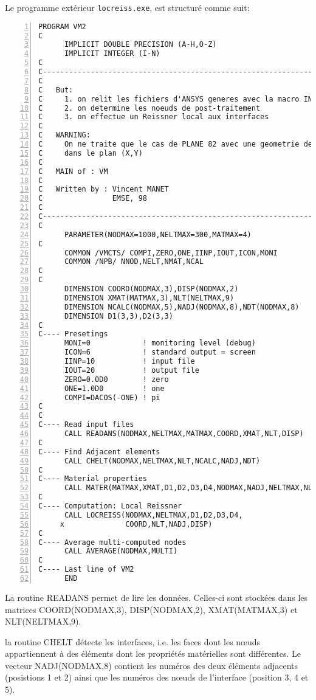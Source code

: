 Le programme extérieur \verb|locreiss.exe|, est structuré comme suit:

\color{gris}\scriptsize
\begin{Verbatim}[numbers=left,numbersep=3pt]
      PROGRAM VM2
C
      IMPLICIT DOUBLE PRECISION (A-H,O-Z)
      IMPLICIT INTEGER (I-N)
C
C--------------------------------------------------------------------------
C
C   But:
C     1. on relit les fichiers d'ANSYS generes avec la macro INTERF
C     2. on determine les noeuds de post-traitement
C     3. on effectue un Reissner local aux interfaces
C
C   WARNING:
C     On ne traite que le cas de PLANE 82 avec une geometrie definie
C     dans le plan (X,Y)
C
C   MAIN of : VM
C
C   Written by : Vincent MANET
C                EMSE, 98
C
C----------------------------------------------------------------------------
C
      PARAMETER(NODMAX=1000,NELTMAX=300,MATMAX=4)
C
      COMMON /VMCTS/ COMPI,ZERO,ONE,IINP,IOUT,ICON,MONI
      COMMON /NPB/ NNOD,NELT,NMAT,NCAL
C
C
      DIMENSION COORD(NODMAX,3),DISP(NODMAX,2)
      DIMENSION XMAT(MATMAX,3),NLT(NELTMAX,9)
      DIMENSION NCALC(NODMAX,5),NADJ(NODMAX,8),NDT(NODMAX,8)
      DIMENSION D1(3,3),D2(3,3)
C
C---- Presetings
      MONI=0            ! monitoring level (debug)
      ICON=6            ! standard output = screen
      IINP=10           ! input file
      IOUT=20           ! output file
      ZERO=0.0D0        ! zero
      ONE=1.0D0         ! one
      COMPI=DACOS(-ONE) ! pi
C
C
C---- Read input files
      CALL READANS(NODMAX,NELTMAX,MATMAX,COORD,XMAT,NLT,DISP)
C
C---- Find Adjacent elements
      CALL CHELT(NODMAX,NELTMAX,NLT,NCALC,NADJ,NDT)
C
C---- Material properties
      CALL MATER(MATMAX,XMAT,D1,D2,D3,D4,NODMAX,NADJ,NELTMAX,NLT)
C
C---- Computation: Local Reissner
      CALL LOCREISS(NODMAX,NELTMAX,D1,D2,D3,D4,
     x              COORD,NLT,NADJ,DISP)
C
C---- Average multi-computed nodes
      CALL AVERAGE(NODMAX,MULTI)
C
C---- Last line of VM2
      END
\end{Verbatim}
\color{black}\normalsize

\medskip
La routine READANS permet de lire les données. Celles-ci sont stockées dans les matrices
COORD(NODMAX,3), DISP(NODMAX,2), XMAT(MATMAX,3) et NLT(NELTMAX,9).

\medskip
la routine CHELT détecte les interfaces, i.e. les faces dont les nœuds appartiennent à des éléments dont les propriétés
matérielles sont différentes.
Le vecteur NADJ(NODMAX,8) contient les numéros des deux éléments adjacents (posistions 1 et 2) ainsi que les
numéros des nœuds de l'interface (position 3, 4 et 5).

